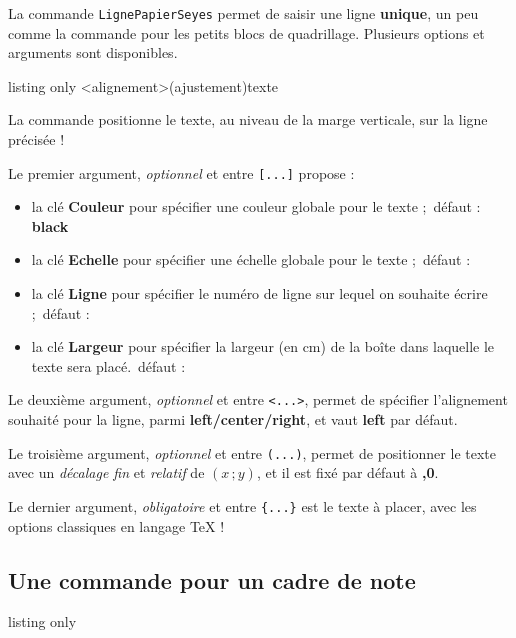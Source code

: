 \documentclass[a4paper]{article}
\newcommand\Cle[1]{{\bfseries\sffamily\textlangle #1\textrangle}}
\begin{document}
La commande \texttt{LignePapierSeyes} permet de saisir une ligne \textbf{unique}, un peu comme la commande pour les petits blocs de quadrillage. Plusieurs options et arguments sont disponibles.

\begin{PresentationCode}{listing only}
\LignePapierSeyes[options]<alignement>(ajustement){texte}
\end{PresentationCode}

La commande positionne le \textsf{texte}, au niveau de la marge verticale, sur la ligne précisée !

\smallskip

Le premier argument, \textit{optionnel} et entre \texttt{[...]} propose :

\begin{itemize}
	\item la clé \Cle{Couleur} pour spécifier une couleur globale pour le texte ;\hfill~défaut : \Cle{black}
	\item la clé \Cle{Echelle} pour spécifier une échelle globale pour le texte ;\hfill~défaut : \Cle{1}
	\item la clé \Cle{Ligne} pour spécifier le numéro de ligne sur lequel on souhaite écrire ;\hfill~défaut : \Cle{1}
	\item la clé \Cle{Largeur} pour spécifier la largeur (en cm) de la boîte dans laquelle le texte sera placé.\hfill~défaut : \Cle{16.8}
\end{itemize}

Le deuxième argument, \textit{optionnel} et entre \texttt{<...>}, permet de spécifier l'alignement souhaité pour la ligne, parmi \Cle{left/center/right}, et vaut \Cle{left} par défaut.

\smallskip

Le troisième argument, \textit{optionnel} et entre \texttt{(...)}, permet de positionner le texte avec un \textit{décalage fin} et \textit{relatif} de $(x\,;y)$, et il est fixé par défaut à \Cle{0,0}.

\smallskip

Le dernier argument, \textit{obligatoire} et entre \texttt{\{...\}} est le texte à placer, avec les options classiques en langage \TeX{} !

\subsection{Une commande pour un cadre de note}

\begin{PresentationCode}{listing only}
\end{PresentationCode}
\end{document}
